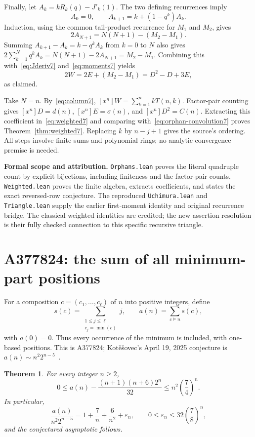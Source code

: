 \documentclass[11pt]{article}
\newtheorem{theorem}{Theorem}[section]
\begin{document}
Finally, let $A_k=kR_k(q)-J'_k(1)$. The two defining recurrences imply
\[
A_0=0,\qquad A_{k+1}=k+(1-q^k)A_k.
\]
Induction, using the common tail-product recurrence for $M_1$ and $M_2$,
gives
\[
2A_{N+1}=N(N+1)-(M_2-M_1).
\]
Summing $A_{k+1}-A_k=k-q^kA_k$ from $k=0$ to $N$ also gives
$2\sum_{k=1}^{N}q^kA_k=N(N+1)-2A_{N+1}=M_2-M_1$.
Combining this with~\eqref{eq:Jderiv7} and~\eqref{eq:moments7} yields
\[
2W=2E+(M_2-M_1)=D^2-D+3E,
\]
as claimed.

Take $N=n$. By~\eqref{eq:column7}, $[x^n]W=\sum_{k=1}^{n}kT(n,k)$.
Factor-pair counting gives $[x^n]D=d(n)$, $[x^n]E=\sigma(n)$, and
$[x^n]D^2=C(n)$. Extracting this coefficient in~\eqref{eq:weighted7}
and comparing with~\eqref{eq:orphan-convolution7} proves
Theorem~\ref{thm:weighted7}. Replacing $k$ by $n-j+1$ gives the
source's ordering. All steps involve finite sums and polynomial rings;
no analytic convergence premise is needed.

\textbf{Formal scope and attribution.}
\texttt{Orphans.lean} proves the literal quadruple count by explicit
bijections, including finiteness and the factor-pair counts.
\texttt{Weighted.lean} proves the finite algebra, extracts coefficients,
and states the exact reversed-row conjecture. The reproduced
\texttt{Uchimura.lean} and \texttt{Triangle.lean} supply the earlier
first-moment identity and original recurrence bridge. The classical
weighted identities are credited; the new assertion resolution is
their fully checked connection to this specific recursive triangle.


\section{A377824: the sum of all minimum-part positions}

For a composition $c=(c_1,\ldots,c_\ell)$ of $n$ into positive integers,
define
\[
 s(c)=\sum_{\substack{1\le j\le\ell\\c_j=\min(c)}}j,
 \qquad a(n)=\sum_{c\models n}s(c),
\]
with $a(0)=0$. Thus every occurrence of the minimum is included, with
one-based positions. This is A377824; Kot\v{e}\v{s}ovec's April 19, 2025
conjecture is $a(n)\sim n^2 2^{n-5}$~\cite{A377824}.

\begin{theorem}\label{thm:minimum-positions7}
For every integer $n\ge2$,
\[
 0\le a(n)-\frac{(n+1)(n+6)2^n}{32}
 \le n^2\left(\frac74\right)^n.
\]
In particular,
\[
 \frac{a(n)}{n^2 2^{n-5}}
 =1+\frac7n+\frac6{n^2}+\varepsilon_n,
 \qquad 0\le\varepsilon_n\le32\left(\frac78\right)^n,
\]
and the conjectured asymptotic follows.
\end{theorem}
\end{document}
